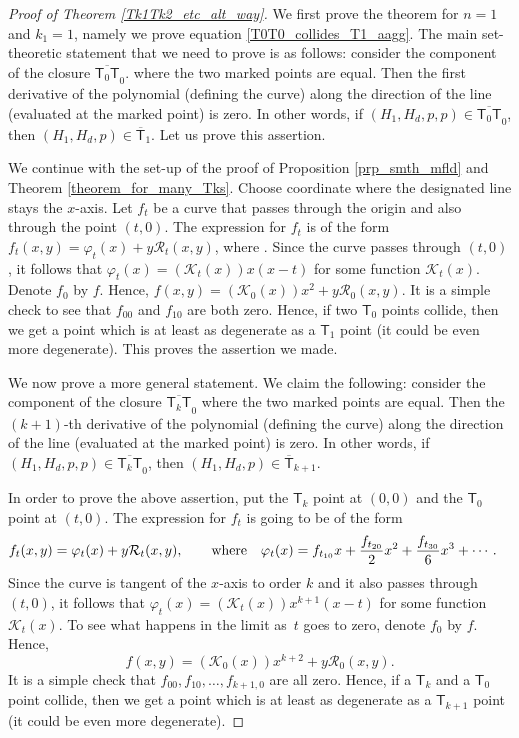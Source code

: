 \documentclass[pdftex]{sigma}
\numberwithin{equation}{section}
\begin{document}
\begin{proof}[Proof of Theorem \ref{Tk1Tk2_etc_alt_way}]
We first prove the theorem for $n = 1$ and $k_1 = 1$, namely
we prove equation \eqref{T0T0_collides_T1_aagg}.
The main set-theoretic statement that we need to prove is as follows:
consider the component of the closure $\overline{\mathsf{T}_0 \mathsf{T}}_0$.
where the two marked points are equal. Then the first derivative of the
polynomial (defining the curve) along the direction of the line
(evaluated at the marked point) is zero. In other words, if
$(H_1, H_d, p, p) \in \overline{\mathsf{T}_0 \mathsf{T}}_0$, then
$(H_1, H_d, p) \in \overline{\mathsf{T}}_1$. Let us prove this assertion.

We continue with the set-up of the proof of Proposition \ref{prp_smth_mfld}
and Theorem \ref{theorem_for_many_Tks}.
Choose coordinate where the designated line stays the $x$-axis.
Let $f_t$ be a curve that passes through the origin and also through the point $(t, 0)$.
The expression for $f_t$ is of the form
$
f_t(x, y)  =  \varphi_t(x)+ y \mathcal{R}_t(x, y)$,
where .
Since the curve passes through $(t, 0)$, it follows that
$
\varphi_{t}(x)  =  (\mathcal{K}_t(x))x(x-t)
$
for some function $\mathcal{K}_t(x)$. Denote $f_0$ by $f$. Hence,
$
f(x, y) =  (\mathcal{K}_0(x))x^2 + y \mathcal{R}_0(x, y)$.
It is a simple check to see that $f_{00}$ and $f_{10}$ are both zero.
Hence, if two $\mathsf{T}_0$ points collide, then we get a point which is at least as degenerate as a
$\mathsf{T}_1$ point (it could be even more degenerate). This proves the
assertion we made.

We now prove a more general statement.
We claim the following:
consider the component of the closure $\overline{\mathsf{T}_{k} \mathsf{T}}_0$
where the two marked points are equal. Then the $(k+1)$-th derivative of the
polynomial (defining the curve) along the direction of the line
(evaluated at the marked point) is zero. In other words, if
$(H_1, H_d, p, p) \in \overline{\mathsf{T}_{k} \mathsf{T}}_0$, then
$(H_1, H_d, p) \in \overline{\mathsf{T}}_{k+1}$.

In order to prove the above assertion, put the
$\mathsf{T}_k$ point at $(0, 0)$ and the $\mathsf{T}_0$ point at $(t, 0)$.
The expression for $f_t$ is going to be of the form
\begin{align*}
f_t(x, y)& = \varphi_t(x)+ y \mathcal{R}_t(x, y),\qquad
\textnormal{where} \quad \varphi_{t}(x) =  f_{t_{10}} x + \frac{f_{t_{20}}}{2} x^2 + \frac{f_{t_{30}}}{6} x^3 + \cdots .
\end{align*}
Since the curve is tangent of the $x$-axis to order $k$ and it also passes through $(t, 0)$,
it follows that
$
\varphi_{t}(x)  =  (\mathcal{K}_t(x))x^{k+1}(x-t)
$
for some function $\mathcal{K}_t(x)$. To see what happens in the limit as~$t$ goes to zero, denote $f_0$ by $f$.
Hence,
\[
f(x, y) =  (\mathcal{K}_0(x))x^{k+2} + y \mathcal{R}_0(x, y).
\]
It is a simple check that $f_{00}, f_{10}, \dots, f_{k+1, 0}$ are all zero.
Hence, if a $\mathsf{T}_k$ and a $\mathsf{T}_0$ point collide, then
we get a point which is at least as degenerate as a $\mathsf{T}_{k+1}$ point (it could be even more degenerate).


\end{proof}
\end{document}
